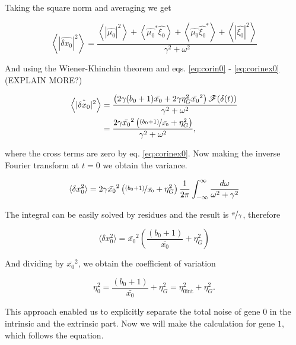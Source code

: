 Taking the square norm and averaging we get

\begin{equation}
\left\langle |\hat{\delta x_0}|^2 \right\rangle = \frac{\left\langle|\hat{\mu_0}|^2\right\rangle + \left\langle\hat{\mu_0}^*\hat{\xi_0}\right\rangle+\left\langle\hat{\mu_0}\hat{\xi_0}^*\right\rangle+\left\langle|\hat{\xi_0}|^2\right\rangle}{\gamma^2 + \omega^2}
\end{equation}

And using the Wiener-Khinchin theorem and eqs. \ref{eq:corin0} - \ref{eq:corinex0} (EXPLAIN MORE?)

\begin{equation}
\label{eq:pgene0}
\begin{split}
\left\langle |\hat{\delta x_0}|^2 \right\rangle &= \frac{\left(2\gamma(b_0+1)\bar{x_0}+ 2\gamma\eta_G^2\bar{x_0}^2\right)\mathscr{F}(\delta(t))}{\gamma^2+\omega^2}\\
&=\frac{2\gamma\bar{x_0}^2\left(\nicefrac{(b_0+1)}{\bar{x_0}}+ \eta_G^2\right)}{\gamma^2+\omega^2},
\end{split}
\end{equation}

where the cross terms are zero by eq. \ref{eq:corinex0}. Now making the inverse Fourier transform at $t=0$ we obtain the variance.

\begin{equation*}
\langle \delta x_0^2 \rangle = 2\gamma\bar{x_0}^2\left(\nicefrac{(b_0+1)}{\bar{x_0}}+ \eta_G^2\right)\frac{1}{2\pi}\int_{-\infty}^{\infty}\frac{d\omega}{\omega^2+\gamma^2}
\end{equation*}

The integral can be easily solved by residues and the result is $\nicefrac{\pi}{\gamma}$, therefore

\begin{equation*}
\langle \delta x_0^2 \rangle = \bar{x_0}^2\left(\frac{(b_0+1)}{\bar{x_0}}+ \eta_G^2\right)
\end{equation*}

And dividing by $\bar{x_0}^2$, we obtain the coefficient of variation

\begin{equation}
  \label{eq:etagene0}
  \boxed{\eta_0^2 = \frac{(b_0+1)}{\bar{x_0}}+ \eta_G^2 = \eta_{0\text{int}}^2+\eta_G^2}.
\end{equation}

This approach enabled us to explicitly separate the total noise of gene $0$ in the intrinsic and the extrinsic part. Now we will make the calculation for gene $1$, which follows the equation.

